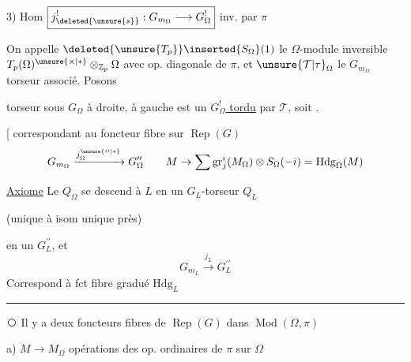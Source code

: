 3) Hom \(\boxed{j_{\deleted{\unsure{s}}}^{!}:G_{m_\Omega}\longrightarrow G_\Omega^{!}}\) \qquad inv. par $\pi$
\reversemarginpar{}\normalmarginpar

On appelle $\deleted{\unsure{T_p}}\inserted{S_\Omega}(1)$  le  $\Omega$-module inversible $T_p(\Omega)^{\unsure{\times|\ast}}\otimes_{\mathbb Z_p}\Omega$ avec op. diagonale de $\pi$,  et $\unsure{\mathcal T|\tau}_\Omega$ le $G_{m_\Omega}$ torseur associé. Posons

 torseur  sous $G_\Omega$ à droite, à gauche est un \uline{$G_\Omega^{!}$ tordu} par $\mathcal T$, soit .

[ correspondant au foncteur fibre  sur $\operatorname{Rep}(G)$
\[
G_{m_\Omega}\xrightarrow{j_\Omega^{\unsure{\prime\prime|\ast}}}G_\Omega^{\prime\prime}
\qquad M\to\sum\operatorname{gr}^{i}_{j}(M_\Omega)\otimes S_\Omega(-i)=\mathrm{Hdg}_\Omega(M)
\]

\unsure{$\subset$} \uline{Axiome} Le  $Q_\Omega$  se descend à $L$ en un $G_L$-torseur $Q_L$

\begin{center}\end{center}

(unique à isom unique près)

en un $G_L^{\prime\prime}$, et
\[
G_{m_L}\xrightarrow{j_L}G_L^{\prime\prime}
\]
Correspond à fct fibre gradué $\mathrm{Hdg}_L$


\noindent\rule{\linewidth}{0.4pt}

\textcircled{} Il y a deux foncteurs fibres de $\operatorname{Rep}(G)$ dans $\operatorname{Mod}(\Omega,\pi)$

a) $M\longrightarrow M_\Omega$ opérations  des op. ordinaires de $\pi$ sur $\Omega$

